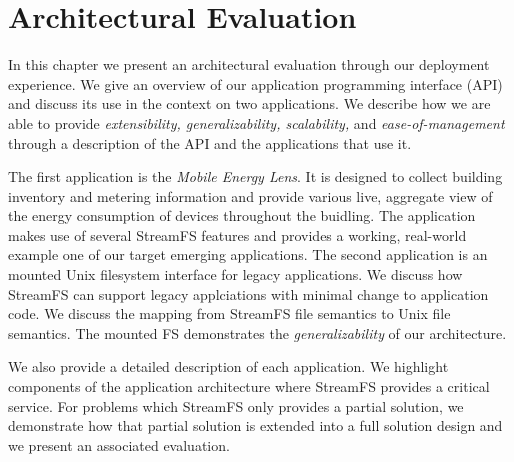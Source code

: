 \chapter{Architectural Evaluation}
\label{chap:ArchEvalMain}

In this chapter we present an architectural evaluation through our deployment experience.  We give an overview of
our application programming interface (API) and discuss its use in the context on two applications.  We describe
how we are able to provide \emph{extensibility, generalizability, scalability,} and \emph{ease-of-management}
through a description of the API and the applications that use it.

The first application is the \emph{Mobile Energy Lens}.  It is designed to collect building inventory and metering
information and provide various live, aggregate view of the energy consumption of devices throughout the buidling.
The application makes use of several StreamFS features and provides a working, real-world example one of our target
emerging applications.  The second application is an mounted Unix filesystem interface for legacy applications.
We discuss how StreamFS can support legacy applciations with minimal change to application code.  We discuss 
the mapping from StreamFS file semantics to Unix file semantics.  The mounted FS demonstrates the \emph{generalizability}
of our architecture.

We also provide a detailed description of each application.  We highlight components of the application architecture
where StreamFS provides a critical service.  For problems which StreamFS only provides a partial solution, we demonstrate 
how that partial solution is extended into a full solution design and we present an associated evaluation.



% 

% 




